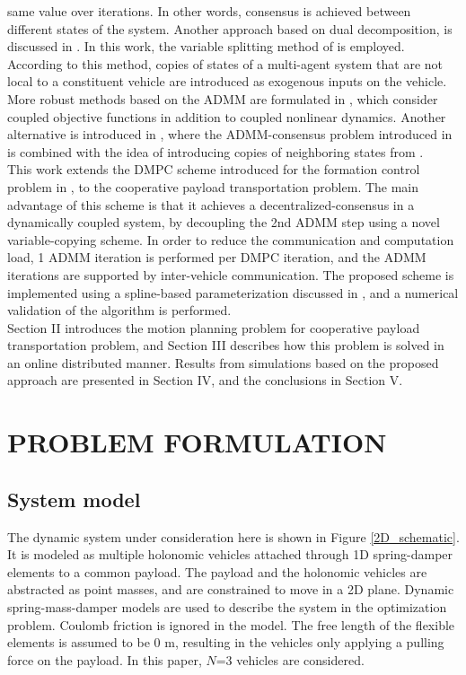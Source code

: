 \documentclass[letterpaper, 10 pt, conference]{ieeeconf}
\begin{document}
 same value over iterations. In other words, consensus is achieved between different states of the system. Another approach based on dual decomposition, is discussed in \cite{c11}. In this work, the variable splitting method of \cite{c8} is employed. According to this method, copies of states of a multi-agent system that are not local to a constituent vehicle are introduced as exogenous inputs on the vehicle. More robust methods based on the ADMM are formulated in \cite{c12}, which consider coupled objective functions in addition to coupled nonlinear dynamics. Another alternative is introduced in \cite{c13}, where the
 ADMM-consensus problem introduced in \cite{c14} is combined with the idea of introducing copies of neighboring states from \cite{c11}.
 \\
 \indent
 This work extends the DMPC scheme introduced for the formation control problem in \cite{c16}, to the cooperative payload transportation problem. The main advantage of this scheme is that it achieves a decentralized-consensus in a dynamically coupled system, by decoupling the 2nd ADMM step using a novel variable-copying scheme. In order to reduce the communication and computation load, 1 ADMM iteration is performed per DMPC iteration, and the ADMM iterations are supported by inter-vehicle communication. The proposed scheme is implemented using a spline-based parameterization discussed in \cite{c16}, and a numerical validation of the algorithm is performed.
\\ \indent
Section  II  introduces  the  motion  planning  problem  for
cooperative payload transportation problem, and Section III describes how
this  problem is solved in an online distributed manner. Results from simulations based on the proposed approach are presented in Section IV, and the conclusions in Section V.
\section{PROBLEM FORMULATION}
\subsection{System model}
The dynamic system under consideration here is shown in Figure \ref{2D_schematic}. It is modeled as multiple holonomic vehicles attached through 1D spring-damper elements to a common payload. The payload and the holonomic vehicles are abstracted as point masses, and are constrained to move in a 2D plane. Dynamic spring-mass-damper models are used to describe the system in the optimization problem. Coulomb friction is ignored in the model. The free length of the flexible elements is assumed to be $0$ m, resulting in the vehicles only applying a pulling force on the payload. In this paper, $N$=3 vehicles are considered.
\end{document}
